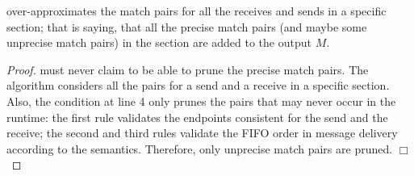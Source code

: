 \begin{lemma}
 over-approximates the match pairs for all the receives and sends in a specific section; that is saying, that all the precise match pairs (and maybe some unprecise match pairs) in the section are added to the output $M$.
\label{lemma:match}
\end{lemma}
\begin{proof}
 must never claim to be able to prune the precise match pairs. The algorithm considers all the pairs for a send and a receive in a specific section. Also, the condition at line 4 only prunes the pairs that may never occur in the runtime: the first rule validates the endpoints consistent for the send and the receive; the second and third rules validate the FIFO order in message delivery according to the semantics. Therefore, only unprecise match pairs are pruned. $\Box$
\end{proof}


